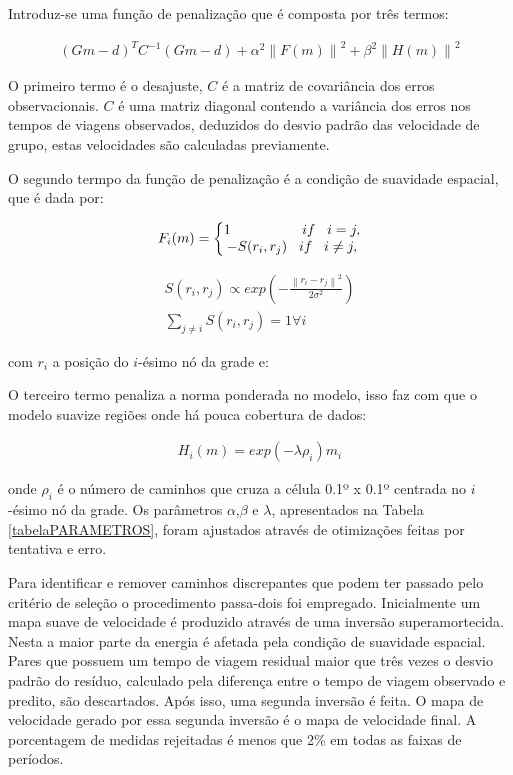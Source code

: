 Introduz-se uma função de penalização que é composta por três termos:

\begin{eqnarray}
(Gm-d)^{T}C^{-1}(Gm-d) + \alpha ^{2} \left \| F(m)  \right \| ^{2} + \beta ^{2 } \left \| H(m)  \right \| ^{2}
\end{eqnarray}

O primeiro termo é o desajuste, $C$ é a matriz de covariância dos erros observacionais. $C$ é uma matriz diagonal contendo a variância dos erros nos tempos de viagens observados, deduzidos do desvio padrão das velocidade de grupo, estas velocidades são calculadas previamente. 

O segundo termpo da função de penalização é a condição de suavidade espacial, que é dada por:

\begin{eqnarray}
F_{i}(m)=
 \left\{\begin{matrix}
1 \hspace{18mm} if \hspace{3mm} i = j,
\\ 
-S(r_{i},r_{j}) \hspace{3mm} if \hspace{3mm} i \neq j,
\end{matrix}\right.
\end{eqnarray}

\begin{eqnarray}
S(r_{i},r_{j}) \propto exp(- \frac{\left \| r_{i}-r_{j}  \right \|^{2}}{2\sigma ^{2}}) \\
\sum_{j\neq i} S(r_{i},r_{j}) = 1         \forall i 
\end{eqnarray}

com $r_{i}$ a posição do $i$-ésimo nó da grade e:


O terceiro termo penaliza a norma ponderada no modelo, isso faz com que o modelo suavize regiões onde há pouca cobertura de dados:

\begin{eqnarray}
H_{i}(m) = exp(-\lambda \rho _{i})m_{i}
\end{eqnarray}

onde $\rho _{i}$ é o número de caminhos que cruza a célula 0.1º x 0.1º centrada no $i$-ésimo nó da grade. Os parâmetros $\alpha$,$\beta$ e $\lambda$, apresentados na Tabela \ref{tabelaPARAMETROS}, foram ajustados através de otimizações feitas por tentativa e erro.

Para identificar e remover caminhos discrepantes que podem ter passado pelo critério de seleção o procedimento passa-dois foi empregado. Inicialmente um mapa suave de velocidade é produzido através de uma inversão superamortecida. Nesta a maior parte da energia é afetada pela condição de suavidade espacial. Pares que possuem um tempo de viagem residual maior que três vezes o desvio padrão do resíduo, calculado pela diferença entre o tempo de viagem observado e predito,  são descartados. Após isso, uma segunda inversão é feita. O mapa de velocidade gerado por essa segunda inversão é o mapa de velocidade final. A porcentagem de medidas rejeitadas é menos que 2\% em todas as faixas de períodos.


